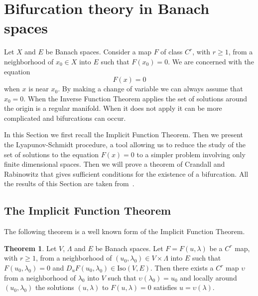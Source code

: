 \documentclass[a4paper,11pt]{article}
\theoremstyle{definition}
\newtheorem{thm}[prop]{Theorem}
\begin{document}
\section{Bifurcation theory in Banach spaces}
\label{sec:bifurcation}

Let $X$ and $E$ be Banach spaces. Consider a map $F$ of class $C^r$, with $r\ge1$, from a neighborhood of $x_0\in X$ into $E$ such that $F(x_0)=0$. We are concerned with the equation
\[
F(x)=0
\]
when $x$ is near $x_0$. By making a change of variable we can always assume that $x_0=0$. When the Inverse Function Theorem applies the set of solutions around the origin is a regular manifold. When it does not apply it can be more complicated and bifurcations can occur.

In this Section we first recall the Implicit Function Theorem. Then we present the Lyapunov-Schmidt procedure, a tool allowing us to reduce the study of the set of solutions to the equation $F(x)=0$ to a simpler problem involving only finite dimensional spaces. Then we will prove a theorem of Crandall and Rabinowitz that gives sufficient conditions for the existence of a bifurcation. All the results of this Section are taken from~\cite{niremberg}.

\subsection{The Implicit Function Theorem}

The following theorem is a well known form of the Implicit Function Theorem.
\begin{thm}
\label{thm:IFT}
Let $V$, $\Lambda$ and $E$ be Banach spaces. Let $F=F(u,\lambda)$ be a $C^r$ map, with $r\ge1$, from a neighborhood of $(u_0,\lambda_0)\in V\times\Lambda$ into $E$ such that $F(u_0,\lambda_0)=0$ and $D_uF(u_0,\lambda_0)\in\text{Iso}(V,E)$. Then there exists a $C^r$ map $\upsilon$ from a neighborhood of $\lambda_0$ into $V$ such that $\upsilon(\lambda_0)=u_0$ and locally around $(u_0,\lambda_0)$ the solutions $(u,\lambda)$ to $F(u,\lambda)=0$ satisfies $u=\upsilon(\lambda)$.
\end{thm}
\end{document}
